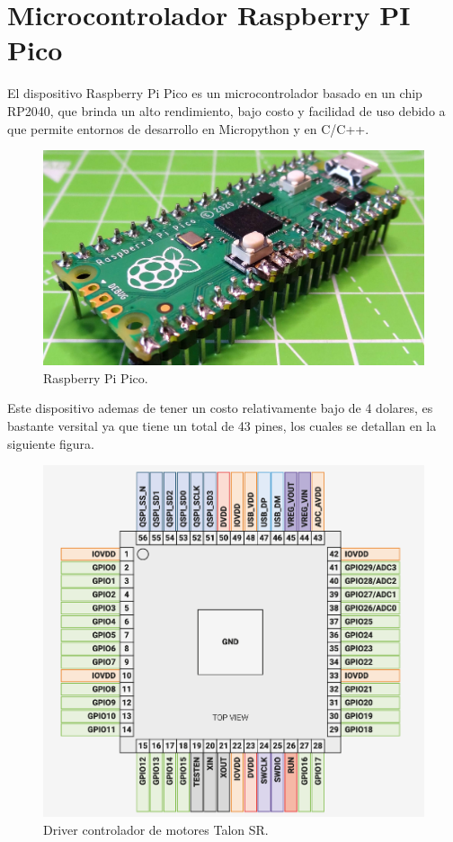 \documentclass[12pt]{book} %
\begin{document}
	\section{Microcontrolador Raspberry PI Pico}
El dispositivo Raspberry Pi Pico es un microcontrolador basado en un chip RP2040, que brinda un alto rendimiento, bajo costo y facilidad de uso debido a que permite entornos de desarrollo en Micropython y en C/C++.\\
\begin{figure}[H]
	\begin{center}
	\includegraphics[scale=0.2]{Pico.jpg}
	\caption{Raspberry Pi Pico.} 
	\end{center}
	\end{figure}


Este dispositivo ademas de tener un costo relativamente bajo de 4 dolares, es bastante versital ya que tiene un total de 43 pines, los cuales se detallan en la siguiente figura.

	\begin{figure}[H]
	\begin{center}
	\includegraphics[scale=0.6]{RP2040.png}
	\caption{Driver controlador de motores Talon SR.} 
	\end{center}
	\end{figure}
\end{document}
